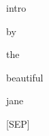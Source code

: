 \documentclass[varwidth=150mm]{standalone}
\begin{document}
\begin{CJK*}{UTF8}{gbsn}
{{{\colorbox{red!5.988210201263428}{\strut intro} \colorbox{red!1.92735755443573}{\strut by} \colorbox{red!7.817478656768799}{\strut the} \colorbox{red!8.964791297912598}{\strut beautiful} \colorbox{red!59.400386810302734}{\strut jane} \colorbox{red!3.6778342723846436}{\strut [SEP]}
}}}
\end{CJK*}
\end{document}
